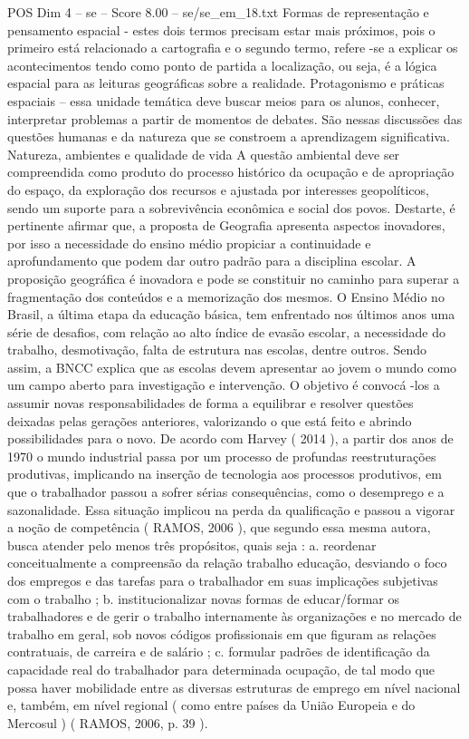 \begin{textsample}{POS Dim 4 – se – Score 8.00 – se/se\_em\_18.txt}
Formas de representação e pensamento espacial - estes dois termos precisam estar mais próximos, pois o primeiro está relacionado a cartografia e o segundo termo, refere -se a explicar os acontecimentos tendo como ponto de partida a localização, ou seja, é a lógica espacial para as leituras geográficas sobre a realidade.
Protagonismo e práticas espaciais – essa unidade temática deve buscar meios para os alunos, conhecer, interpretar problemas a partir de momentos de debates.
São nessas discussões das questões humanas e da natureza que se constroem a aprendizagem significativa.
Natureza, ambientes e qualidade de vida A questão ambiental deve ser compreendida como produto do processo histórico da ocupação e de apropriação do espaço, da exploração dos recursos e ajustada por interesses geopolíticos, sendo um suporte para a sobrevivência econômica e social dos povos.
Destarte, é pertinente afirmar que, a proposta de Geografia apresenta aspectos inovadores, por isso a necessidade do ensino médio propiciar a continuidade e aprofundamento que podem dar outro padrão para a disciplina escolar.
A proposição geográfica é inovadora e pode se constituir no caminho para superar a fragmentação dos conteúdos e a memorização dos mesmos.
O Ensino Médio no Brasil, a última etapa da educação básica, tem enfrentado nos últimos anos uma série de desafios, com relação ao alto índice de evasão escolar, a necessidade do trabalho, desmotivação, falta de estrutura nas escolas, dentre outros.
Sendo assim, a BNCC explica que as escolas devem apresentar ao jovem o mundo como um campo aberto para investigação e intervenção.
O objetivo é convocá -los a assumir novas responsabilidades de forma a equilibrar e resolver questões deixadas pelas gerações anteriores, valorizando o que está feito e abrindo possibilidades para o novo.
De acordo com Harvey ( 2014 ), a partir dos anos de 1970 o mundo industrial passa por um processo de profundas reestruturações produtivas, implicando na inserção de tecnologia aos processos produtivos, em que o trabalhador passou a sofrer sérias consequências, como o desemprego e a sazonalidade.
Essa situação implicou na perda da qualificação e passou a vigorar a noção de competência ( RAMOS, 2006 ), que segundo essa mesma autora, busca atender pelo menos três propósitos, quais seja : a. reordenar conceitualmente a compreensão da relação trabalho educação, desviando o foco dos empregos e das tarefas para o trabalhador em suas implicações subjetivas com o trabalho ; b. institucionalizar novas formas de educar/formar os trabalhadores e de gerir o trabalho internamente às organizações e no mercado de trabalho em geral, sob novos códigos profissionais em que figuram as relações contratuais, de carreira e de salário ; c. formular padrões de identificação da capacidade real do trabalhador para determinada ocupação, de tal modo que possa haver mobilidade entre as diversas estruturas de emprego em nível nacional e, também, em nível regional ( como entre países da União Europeia e do Mercosul ) ( RAMOS, 2006, p. 39 ).

\end{textsample}
